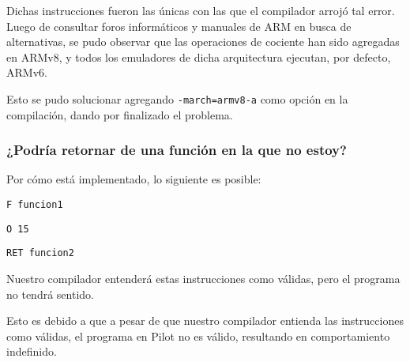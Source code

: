 \documentclass[12pt,spanish]{article}
\begin{document}
Dichas instrucciones fueron las únicas con las que el compilador arrojó tal error. Luego de consultar foros informáticos y manuales de ARM en busca de alternativas, se pudo observar que las operaciones de cociente han sido agregadas en ARMv8, y todos los emuladores de dicha arquitectura ejecutan, por defecto, ARMv6. 

Esto se pudo solucionar agregando \texttt{-march=armv8-a} como opción en la compilación, dando por finalizado el problema.

\subsubsection{¿Podría retornar de una función en la que no estoy?}

Por cómo está implementado, lo siguiente es posible:

\noindent
\texttt{F funcion1}

\noindent
\texttt{O 15}

\noindent
\texttt{RET funcion2}

\noindent
Nuestro compilador entenderá estas instrucciones como válidas, pero el programa no tendrá sentido. 

Esto es debido a que a pesar de que nuestro compilador entienda las instrucciones como válidas, el programa en Pilot no es válido, resultando en comportamiento indefinido.
\end{document}

